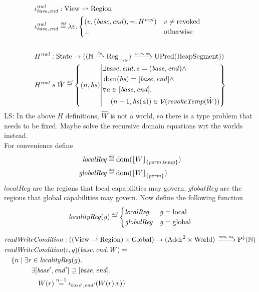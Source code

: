 \documentclass{article}
\DeclarePairedDelimiter\floor{\lfloor}{\rfloor}
\newcommand{\parfun}{\rightharpoonup}
\newcommand{\finparfun}{\xrightharpoonup{\textit{\tiny{fin}}}}
\newcommand{\monnefun}{\xrightarrow{\textit{\tiny{mon, ne}}}}
\newcommand{\fun}{\rightarrow}
\newcommand{\defeq}{\stackrel{\textit{\tiny{def}}}{=}}
\newcommand{\nequal}[1][n]{\stackrel{\tiny{#1}}{=}}
\DeclareMathOperator{\dom}{dom}
\newcommand\lau[1]{{\color{purple} \sf \footnotesize {LS: #1}}\\}
\newcommand{\var}[1]{\mathit{#1}}
\newcommand{\hs}{\var{hs}}
\newcommand{\gl}{\var{g}}
\newcommand{\addr}{\var{a}}
\newcommand{\start}{\var{base}}
\newcommand{\addrend}{\var{end}}
\newcommand{\perm}{\var{perm}}
\newcommand{\plainfun}[2]{
  \ifthenelse{\equal{#2}{}}
             {\mathit{#1}}
             {\mathit{#1}(#2)}
}
\newcommand{\writeCond}[1]{\plainfun{readWriteCondition}{#1}}
\newcommand{\revokeTemp}[1]{\plainfun{revokeTemp}{#1}}
\newcommand{\erase}[2]{\floor*{#1}_{\{#2\}}}
\newcommand{\futurestr}{\mathbin{\sqsupseteq}_{\var{str}}}
\newcommand{\asmType}{\plaindom{AsmType}}
\newcommand{\plaindom}[1]{\mathrm{#1}}
\newcommand{\Addrs}{\plaindom{Addr}}
\newcommand{\HeapSegments}{\plaindom{HeapSegment}}
\newcommand{\nats}{\mathbb{N}}
\newcommand{\Globals}{\plaindom{Global}}
\newcommand{\States}{\plaindom{State}}
\newcommand{\Regions}{\plaindom{Region}}
\newcommand{\Reg}{\plaindom{Reg}}
\newcommand{\Regstr}{\Reg_{\futurestr}}
\newcommand{\Worlds}{\plaindom{World}}
\newcommand{\UPred}[1]{\plaindom{UPred}(#1)}
\newcommand{\DCPred}[1]{\plaindom{P}^\downarrow(#1)}
\newcommand{\Views}{\plaindom{View}}
\newcommand{\intr}[2]{\mathcal{#1}}
\newcommand{\valueintr}[1]{\intr{V}{#1}}
\newcommand{\stdvr}{\valueintr{\asmType}}
\newcommand{\npair}[2][n]{\left(#1,#2 \right)}
\newcommand{\plainperm}[1]{\mathrm{#1}}
\newcommand{\local}{\plainperm{local}}
\newcommand{\glob}{\plainperm{global}}
\newcommand{\localReg}{\var{localReg}}
\newcommand{\globalReg}{\var{globalReg}}
\newcommand{\plainview}[1]{\mathrm{#1}}
\newcommand{\temp}{\plainview{temp}}
\newcommand{\revoked}{\plainview{revoked}}
\begin{document}
\begin{align*}
  &\iota_{\start,\addrend}^{\var{nwl}} : \Views \parfun \Regions \\
  &\iota_{\start,\addrend}^{\var{nwl}} \defeq \lambda v \ldotp
    \begin{cases}
      (v,(\start,\addrend),=,H^{\var{nwl}}) & v \neq \revoked \\
      \bot & \text{otherwise}
\end{cases}
\\ \\
  &H^{\var{nwl}} : \States \fun ((\nats \finparfun \Regstr) \monnefun \UPred{\HeapSegments})\\
  &H^{\var{nwl}} \; s \;\hat{W} \defeq \left\{\npair{\hs} \middle|
    \begin{aligned}
      &\exists \start,\addrend \ldotp s = (\start,\addrend) \land \\
      &\dom(\hs) = [\start,\addrend] \land \\
      &\forall \addr \in [\start,\addrend] \ldotp \\
      &\quad \npair[n-1]{\hs(\addr)} \in \stdvr(\revokeTemp{\hat{W}})
    \end{aligned}
  \right\}
\end{align*}
\lau{In the above $H$ definitions, $\hat{W}$ is not a world, so there is a type problem that needs to be fixed. Maybe solve the recursive domain equations wrt the worlds instead.} 

For convenience define
\begin{align*}
  \localReg & \defeq \dom(\erase{W}{\perm,\temp}) \\
  \globalReg & \defeq \dom(\erase{W}{\perm})
\end{align*}
$\localReg$ are the regions that local capabilities may govern. $\globalReg$ are the regions that global capabilities may govern. Now define the following function
\[
  \var{localityReg}(\gl) \defeq 
  \begin{cases}
    \localReg & \gl = \local \\
    \globalReg & \gl = \glob
  \end{cases}
\]

\begin{align*}
    & \writeCond{} : ((\Views \rightharpoonup \Regions) \times \Globals) \fun (\Addrs^2 \times \Worlds) \monnefun \DCPred{\nats}  \\
    & \writeCond{}(\iota,\gl)(\start,\addrend,W) =  \\
    & \quad \begin{aligned}[t]
              \{ n \mid & \;\exists r \in \var{localityReg}(g) \ldotp \\
              & \;\quad \exists [\start',\addrend'] \supseteq [\start,\addrend] \ldotp \\
              & \;\qquad W(r)\nequal[n-1] \iota_{\start',\addrend'}(W(r).v) \}
            \end{aligned}
\end{align*}
\end{document}

